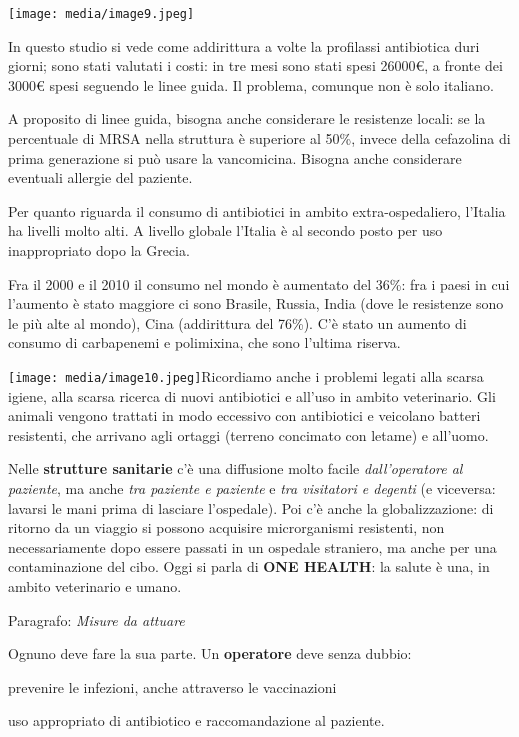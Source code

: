 \documentclass[]{article}
\newcommand{\euro}{€}
\begin{document}
\texttt{[image: media/image9.jpeg]}

In questo studio si vede come addirittura a volte la profilassi
antibiotica duri giorni; sono stati valutati i costi: in tre mesi sono
stati spesi 26000\euro{}, a fronte dei 3000\euro{} spesi seguendo le
linee guida. Il problema, comunque non è solo italiano.

A proposito di linee guida, bisogna anche considerare le resistenze
locali: se la percentuale di MRSA nella struttura è superiore al 50\%,
invece della cefazolina di prima generazione si può usare la
vancomicina. Bisogna anche considerare eventuali allergie del paziente.

Per quanto riguarda il consumo di antibiotici in ambito
extra-ospedaliero, l'Italia ha livelli molto alti. A livello globale
l'Italia è al secondo posto per uso inappropriato dopo la Grecia.

Fra il 2000 e il 2010 il consumo nel mondo è aumentato del 36\%: fra i
paesi in cui l'aumento è stato maggiore ci sono Brasile, Russia, India
(dove le resistenze sono le più alte al mondo), Cina (addirittura del
76\%). C'è stato un aumento di consumo di carbapenemi e polimixina, che
sono l'ultima riserva.

\texttt{[image: media/image10.jpeg]}Ricordiamo
anche i problemi legati alla scarsa igiene, alla scarsa ricerca di nuovi
antibiotici e all'uso in ambito veterinario. Gli animali vengono
trattati in modo eccessivo con antibiotici e veicolano batteri
resistenti, che arrivano agli ortaggi (terreno concimato con letame) e
all'uomo.

Nelle \textbf{strutture sanitarie} c'è una diffusione molto facile
\emph{dall'operatore al paziente}, ma anche \emph{tra paziente e
paziente} e \emph{tra visitatori e degenti} (e viceversa: lavarsi le
mani prima di lasciare l'ospedale). Poi c'è anche la globalizzazione: di
ritorno da un viaggio si possono acquisire microrganismi resistenti, non
necessariamente dopo essere passati in un ospedale straniero, ma anche
per una contaminazione del cibo. Oggi si parla di \textbf{ONE HEALTH}:
la salute è una, in ambito veterinario e umano.

Paragrafo: \emph{Misure da attuare}

Ognuno deve fare la sua parte. Un \textbf{operatore} deve senza dubbio:

prevenire le infezioni, anche attraverso le vaccinazioni

uso appropriato di antibiotico e raccomandazione al paziente.
\end{document}
